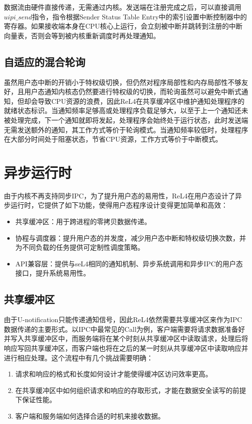 数据流由硬件直接传递，无需通过内核。发送端在注册完成之后，可以直接调用$uipi\_send$指令，指令根据Sender Status Table Entry中的索引设置中断控制器中的寄存器。如果接收端本身在CPU核心上运行，会立刻被中断并跳转到注册的中断向量表，否则会等到被内核重新调度时再处理通知。

\subsection{自适应的混合轮询}
虽然用户态中断的开销小于特权级切换，但仍然对程序局部性和内存局部性不够友好，且用户态通知内核态仍然要进行特权级的切换，而轮询虽然可以避免中断式通知，但却会导致CPU资源的浪费，因此ReL4在共享缓冲区中维护通知处理程序的就绪状态标识。当通知频率足够高或处理程序负载足够大，以至于上一个通知还未被处理完成，下一个通知就即将发起，处理程序会始终处于运行状态，此时发送端无需发送额外的通知，其工作方式等价于轮询模式。当通知频率较低时，处理程序在大部分时间处于阻塞状态，节省CPU资源，工作方式等价于中断模式。

\section{异步运行时}
由于内核不再支持同步IPC，为了提升用户态的易用性，ReL4在用户态设计了异步运行时，它提供了如下功能，使得用户态程序设计变得更加简单和高效：
\begin{itemize}
  \item 共享缓冲区：用于跨进程的零拷贝数据传递。
  \item 协程与调度器：提升用户态的并发度，减少用户态中断和特权级切换次数，并为不同负载的任务提供可定制性调度策略。
  \item API兼容层：提供与seL4相同的通知机制、异步系统调用和异步IPC的用户态接口，提升系统易用性。
\end{itemize}

\subsection{共享缓冲区}
由于U-notification只能传递通知信号，因此ReL4依然需要共享缓冲区来作为IPC数据传递的主要形式。以IPC中最常见的Call为例，客户端需要将请求数据准备好并写入共享缓冲区中，而服务端将在某个时刻从共享缓冲区中读取请求，处理后将响应写回共享缓冲区，而客户端也将在之后的某一时刻从共享缓冲区中读取响应并进行相应处理。这个流程中有几个挑战需要明确：
\begin{enumerate}
  \item 请求和响应的格式和长度如何设计才能使得缓冲区访问效率更高。
  \item 在共享缓冲区中如何组织请求和响应的存取形式，才能在数据安全读写的前提下保证性能。
  \item 客户端和服务端如何选择合适的时机来接收数据。
\end{enumerate}

